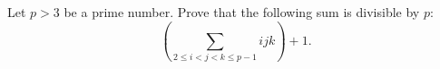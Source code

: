 \problem{}
Let $p > 3$ be a prime number.
Prove that the following sum is divisible by  $p$:
\[
    \left(
        \sum_{2 \leq i < j < k \leq p-1}
            i j k
    \right)
    + 1
.\]

\solution

\endproblem
